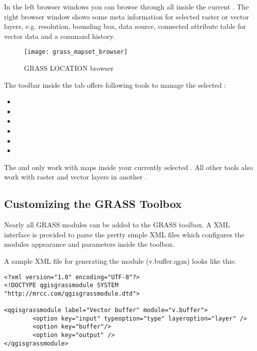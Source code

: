 In the left browser windows you can browse through all 
inside the current . The right browser window shows some
meta information for selected raster or vector layers, e.g. resolution,
bounding box, data source, connected attribute table for vector data and a
command history.

\begin{figure}[h]
 \centering
 \texttt{[image: grass\_mapset\_browser]}
 \caption{GRASS LOCATION browser \nixcaption}\label{fig:grass_mapset_browser}
\end{figure}

The toolbar inside the  tab offers following tools to manage
the selected :

\begin{itemize}[label=--]
\item {}
\item {}
\item {}
\item {}
\item {}
\item {}
\end{itemize}

The  and
 only work with maps inside
your currently selected . All other tools also work with
raster and vector layers in another .

\subsection{Customizing the GRASS Toolbox} 
\label{sec:toolbox-customizing}

Nearly all GRASS modules can be added to the GRASS toolbox. A XML
interface is provided to parse the pretty simple XML files which configures
the modules appearance and parameters inside the toolbox.

A sample XML file for generating the module  (v.buffer.qgm)
looks like this:
\begin{verbatim}
<?xml version="1.0" encoding="UTF-8"?>
<!DOCTYPE qgisgrassmodule SYSTEM "http://mrcc.com/qgisgrassmodule.dtd">

<qgisgrassmodule label="Vector buffer" module="v.buffer">
        <option key="input" typeoption="type" layeroption="layer" />
        <option key="buffer"/>
        <option key="output" />
</qgisgrassmodule>
\end{verbatim}

